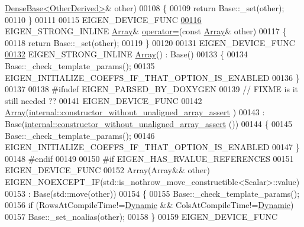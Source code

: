 \begin{DoxyCode}
      \hyperlink{group___core___module_class_eigen_1_1_dense_base}{DenseBase<OtherDerived>}& other)
00108     \{
00109       \textcolor{keywordflow}{return} Base::\_set(other);
00110     \}
00111 
00115     EIGEN\_DEVICE\_FUNC
\hyperlink{group___core___module_a56cb38f362f88a6239f802ea226fee6a}{00116}     EIGEN\_STRONG\_INLINE \hyperlink{group___core___module_class_eigen_1_1_array}{Array}& \hyperlink{group___core___module_a56cb38f362f88a6239f802ea226fee6a}{operator=}(\textcolor{keyword}{const} \hyperlink{group___core___module_class_eigen_1_1_array}{Array}& other)
00117     \{
00118       \textcolor{keywordflow}{return} Base::\_set(other);
00119     \}
00120     
00131     EIGEN\_DEVICE\_FUNC
\hyperlink{group___core___module_a715524a79accfdc70dbc8cab1d7086ae}{00132}     EIGEN\_STRONG\_INLINE \hyperlink{group___core___module_a715524a79accfdc70dbc8cab1d7086ae}{Array}() : Base()
00133     \{
00134       Base::\_check\_template\_params();
00135       EIGEN\_INITIALIZE\_COEFFS\_IF\_THAT\_OPTION\_IS\_ENABLED
00136     \}
00137 
00138 \textcolor{preprocessor}{#ifndef EIGEN\_PARSED\_BY\_DOXYGEN}
00139     \textcolor{comment}{// FIXME is it still needed ??}
00141 \textcolor{comment}{}    EIGEN\_DEVICE\_FUNC
00142     \hyperlink{group___core___module_class_eigen_1_1_array}{Array}(\hyperlink{struct_eigen_1_1internal_1_1constructor__without__unaligned__array__assert}{internal::constructor\_without\_unaligned\_array\_assert}
      )
00143       : Base(\hyperlink{struct_eigen_1_1internal_1_1constructor__without__unaligned__array__assert}{internal::constructor\_without\_unaligned\_array\_assert}
      ())
00144     \{
00145       Base::\_check\_template\_params();
00146       EIGEN\_INITIALIZE\_COEFFS\_IF\_THAT\_OPTION\_IS\_ENABLED
00147     \}
00148 \textcolor{preprocessor}{#endif}
00149 
00150 \textcolor{preprocessor}{#if EIGEN\_HAS\_RVALUE\_REFERENCES}
00151     EIGEN\_DEVICE\_FUNC
00152     Array(Array&& other) EIGEN\_NOEXCEPT\_IF(std::is\_nothrow\_move\_constructible<Scalar>::value)
00153       : Base(std::move(other))
00154     \{
00155       Base::\_check\_template\_params();
00156       \textcolor{keywordflow}{if} (RowsAtCompileTime!=\hyperlink{namespace_eigen_ad81fa7195215a0ce30017dfac309f0b2}{Dynamic} && ColsAtCompileTime!=\hyperlink{namespace_eigen_ad81fa7195215a0ce30017dfac309f0b2}{Dynamic})
00157         Base::\_set\_noalias(other);
00158     \}
00159     EIGEN\_DEVICE\_FUNC

\end{DoxyCode}
